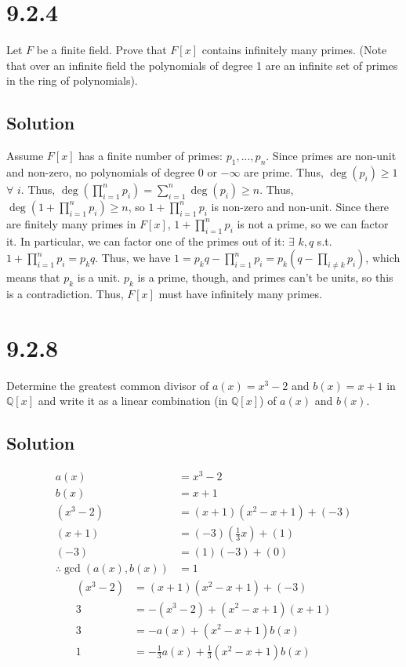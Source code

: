\documentclass[fleqn]{article}
\begin{document}
    
    \section{9.2.4}
    Let $F$ be a finite field.  Prove that $F[x]$ contains infinitely many primes.  (Note that over an infinite field the polynomials of degree 1 are an infinite set of primes in the ring of polynomials).
        
        \subsection{Solution}
        Assume $F[x]$ has a finite number of primes: $p_1, ..., p_n$.  Since primes are non-unit and non-zero, no polynomials of degree 0 or $-\infty$ are prime.  Thus, $\deg(p_i) \geq 1$ $\forall$ $i$.  Thus, $\deg\left(\prod\limits_{i = 1}^{n} p_i\right) = \sum\limits_{i = 1}^{n} \deg(p_i) \geq n$.  Thus, $\deg\left(1 + \prod\limits_{i = 1}^{n} p_i\right) \geq n$, so $1 + \prod\limits_{i = 1}^{n} p_i$ is non-zero and non-unit.  Since there are finitely many primes in $F[x]$, $1 + \prod\limits_{i = 1}^{n} p_i$ is not a prime, so we can factor it.  In particular, we can factor one of the primes out of it: $\exists$ $k, q$ s.t.\ $1 + \prod\limits_{i = 1}^{n} p_i = p_k q$.  Thus, we have $1 = p_k q - \prod\limits_{i = 1}^{n} p_i = p_k \left(q - \prod\limits_{i \neq k} p_i\right)$, which means that $p_k$ is a unit.  $p_k$ is a prime, though, and primes can't be units, so this is a contradiction.  Thus, $F[x]$ must have infinitely many primes.
    
    \section{9.2.8}
    Determine the greatest common divisor of $a(x) = x^3 - 2$ and $b(x) = x + 1$ in $\mathbb{Q}[x]$ and write it as a linear combination (in $\mathbb{Q}[x]$) of $a(x)$ and $b(x)$.
        
        \subsection{Solution}
        \begin{align}
            a(x) &= x^3 - 2 \\
            b(x) &= x + 1 \\
            (x^3 - 2) &= (x + 1)(x^2 - x + 1) + (-3) \\
            (x + 1) &= (-3)\left(\frac{1}{3} x\right) + (1) \\
            (-3) &= (1)(-3) + (0) \\
            \therefore{} \gcd(a(x), b(x)) &= 1
        \end{align}
        \begin{align}
            (x^3 - 2) &= (x + 1)(x^2 - x + 1) + (-3) \\
            3 &= -(x^3 - 2) + (x^2 - x + 1)(x + 1) \\
            3 &= -a(x) + (x^2 - x + 1) b(x) \\
            1 &= -\frac{1}{3} a(x) + \frac{1}{3} (x^2 - x + 1) b(x)
        \end{align}
    
\end{document}
